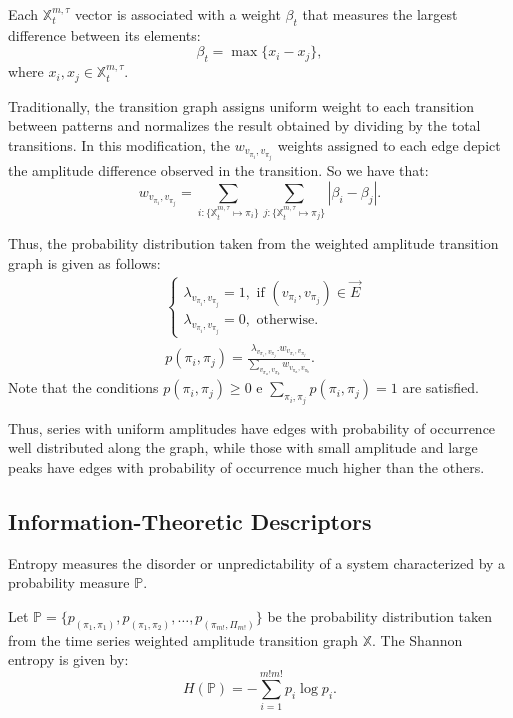 \documentclass{isprs}
\begin{document}
Each $\mathbb{X}^{m, \tau}_t$ vector is associated with a weight $\beta_t$ that measures the largest difference between its elements:
\begin{equation}
\beta_t = \max\{x_i - x_j\},
\end{equation}
where $x_i, x_j \in \mathbb{X}^{m, \tau}_t$.

Traditionally, the transition graph assigns uniform weight to each transition between patterns and normalizes the result obtained by dividing by the total transitions.
In this modification, the $w_{v_{\pi_i}, v_{\pi_j}}$ weights assigned to each edge depict the amplitude difference observed in the transition.
So we have that:	
\begin{equation}
w_{v_{\pi_i}, v_{\pi_j}} =  \sum_{i : \{\mathbb{X}^{m,\tau}_t \mapsto \pi_i\}} \sum_{j : \{\mathbb{X}^{m,\tau}_t \mapsto \pi_j\}} |\beta_i - \beta_j| .
\end{equation}

Thus, the probability distribution taken from the weighted amplitude transition graph is given as follows:	
\begin{align}
&\left\{\begin{array}{l}
\lambda_{v_{\pi_i}, v_{\pi_j}} = 1, \text{ if } (v_{\pi_i}, v_{\pi_j}) \in \vec{E} \\
\lambda_{v_{\pi_i}, v_{\pi_j}} = 0, \text{ otherwise}.
\end{array}\right. \\
%
&p(\pi_i, \pi_j) = \frac{\lambda_{v_{\pi_i}, v_{\pi_j}} . w_{v_{\pi_i}, v_{\pi_j}}}{\sum_{v_{\pi_a}, v_{\pi_b}} w_{v_{\pi_a}, v_{\pi_b}}}.
\end{align}
Note that the conditions $p(\pi_i, \pi_j) \ge 0$ e $\sum_{\pi_i, \pi_j} p(\pi_i, \pi_j) = 1$ are satisfied.

Thus, series with uniform amplitudes have edges with probability of occurrence well distributed along the graph, while those with small amplitude and large peaks have edges with probability of occurrence much higher than the others.

\subsection{Information-Theoretic Descriptors}\label{HC}

Entropy measures the disorder or unpredictability of a system characterized by a probability measure $\mathbb{P}$.

Let $\mathbb{P} = \{p_{(\pi_1, \pi_1)}, p_{(\pi_1, \pi_2)}, \dots, p_{(\pi_{m!}, \Pi_{m!})} \}$ be the probability distribution taken from the time series weighted amplitude transition graph $\mathbb{X}$.
The Shannon entropy is given by:	
\begin{equation}
H(\mathbb{P}) = -\sum_{i=1}^{m!m!} p_i \log p_i .
\label{eq:Entropia}
\end{equation}
\end{document}
